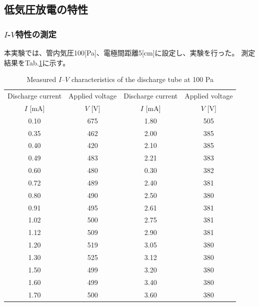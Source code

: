 \documentclass[dvipdfmx]{jsarticle}
\newcommand{\tablab}[1]{Tab.\ref{tab:#1}}%
\begin{document}
    \subsection{低気圧放電の特性}
        \subsubsection*{$I$-$V$特性の測定}
            本実験では、管内気圧100[Pa]、電極間距離5[cm]に設定し、実験を行った。
            測定結果を\tablab{1}に示す。
            
            \begin{table}[H]
                \centering
                \caption{Measured $I$–$V$ characteristics of the discharge tube at 100 Pa}\label{tab:1}
                    \begin{tabular}{cc|cc}
                    \hline
                    Discharge current & Applied voltage & Discharge current & Applied voltage \\
                    $I$ [mA]          & $V$ [V]         & $I$ [mA]          & $V$ [V] \\
                    \hline
                    0.10 & 675 & 1.80 & 505 \\
                    0.35 & 462 & 2.00 & 385 \\
                    0.40 & 420 & 2.10 & 385 \\
                    0.49 & 483 & 2.21 & 383 \\
                    0.60 & 480 & 0.30 & 382 \\
                    0.72 & 489 & 2.40 & 381 \\
                    0.80 & 490 & 2.50 & 380 \\
                    0.91 & 495 & 2.61 & 381 \\
                    1.02 & 500 & 2.75 & 381 \\
                    1.12 & 509 & 2.90 & 381 \\
                    1.20 & 519 & 3.05 & 380 \\
                    1.30 & 525 & 3.12 & 380 \\
                    1.50 & 499 & 3.20 & 380 \\
                    1.60 & 499 & 3.40 & 380 \\
                    1.70 & 500 & 3.60 & 380 \\
                    \hline
                    \end{tabular}%
            \end{table}
\end{document}
